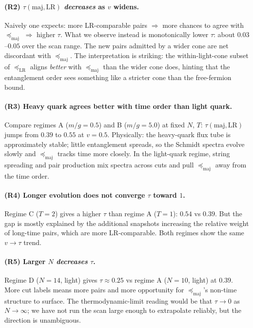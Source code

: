 \documentclass[11pt,a4paper]{article}
\theoremstyle{definition}
\theoremstyle{plain}
\theoremstyle{remark}
\newcommand{\maj}{\mathrm{maj}}
\newcommand{\LR}{\mathrm{LR}}
\begin{document}
\paragraph{(R2) $\tau(\maj, \LR)$ \emph{decreases} as $v$ widens.}
Naively one expects: more LR-comparable pairs $\Rightarrow$ more
chances to agree with $\preceq_{\maj}$ $\Rightarrow$ higher $\tau$.
What we observe instead is monotonically lower $\tau$: about
$0.03$--$0.05$ over the scan range.  The new pairs admitted by a
wider cone are net discordant with $\preceq_{\maj}$.  The interpretation
is striking: the within-light-cone subset of $\preceq_{\LR}$ aligns
\emph{better} with $\preceq_{\maj}$ than the wider cone does, hinting
that the entanglement order sees something like a stricter cone than
the free-fermion bound.

\paragraph{(R3) Heavy quark agrees better with time order than light quark.}
Compare regimes A ($m/g = 0.5$) and B ($m/g = 5.0$) at fixed $N$, $T$:
$\tau(\maj, \LR)$ jumps from $0.39$ to $0.55$ at $v = 0.5$.  Physically:
the heavy-quark flux tube is approximately stable; little entanglement
spreads, so the Schmidt spectra evolve slowly and $\preceq_{\maj}$
tracks time more closely.  In the light-quark regime, string
spreading and pair production mix spectra across cuts and pull
$\preceq_{\maj}$ away from the time order.

\paragraph{(R4) Longer evolution does not converge $\tau$ toward $1$.}
Regime C ($T = 2$) gives a higher $\tau$ than regime A ($T = 1$):
$0.54$ vs $0.39$.  But the gap is mostly explained by the additional
snapshots increasing the relative weight of long-time pairs, which are
more LR-comparable.  Both regimes show the same $v \to \tau$ trend.

\paragraph{(R5) Larger $N$ \emph{decreases} $\tau$.}
Regime D ($N = 14$, light) gives $\tau \approx 0.25$ vs regime A
($N = 10$, light) at $0.39$.  More cut labels means more pairs and
more opportunity for $\preceq_{\maj}$'s non-time structure to surface.
The thermodynamic-limit reading would be that $\tau \to 0$ as $N \to
\infty$; we have not run the scan large enough to extrapolate
reliably, but the direction is unambiguous.
\end{document}
